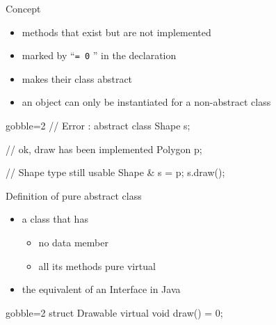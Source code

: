 \begin{frame}[fragile]
  \begin{block}{Concept}
    \begin{itemize}
    \item methods that exist but are not implemented
      \item marked by ``{\tt = 0} '' in the declaration
    \item makes their class abstract
    \item an object can only be instantiated for a non-abstract class
    \end{itemize}
  \end{block}
  \pause
  \begin{multicols}{2}
    \begin{cppcode*}{gobble=2}
      // Error : abstract class
      Shape s;

      // ok, draw has been implemented
      Polygon p;

      // Shape type still usable
      Shape & s = p;
      s.draw();
    \end{cppcode*}
    \columnbreak
  \end{multicols}
\end{frame}

\begin{frame}[fragile]
  \begin{block}{Definition of pure abstract class}
    \begin{itemize}
    \item a class that has
      \begin{itemize}
        \item no data member
        \item all its methods pure virtual
      \end{itemize}
    \item the equivalent of an Interface in Java
    \end{itemize}
  \end{block}
  \begin{multicols}{2}
    \begin{cppcode*}{gobble=2}
      struct Drawable {
        virtual void draw() = 0;
      }
    \end{cppcode*}
    \columnbreak
    \center
  \end{multicols}
\end{frame}

